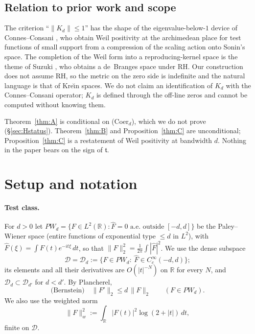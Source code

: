 \documentclass[11pt]{amsart}
\theoremstyle{definition}
\theoremstyle{remark}
\newcommand{\PW}{\mathit{PW}_d}
\newcommand{\tform}{\mathfrak t}
\newcommand{\Kop}{K}
\newcommand{\Norm}[1]{\lVert #1 \rVert}
\begin{document}
\subsection{Relation to prior work and scope}
The criterion ``$\Norm{\Kop_d}\le1$'' has the shape of the eigenvalue-below-$1$ device of
Connes--Consani \cite{ConnesConsani}, who obtain Weil positivity at the archimedean place
for test functions of small support from a compression of the scaling action onto Sonin's
space. The completion of the Weil form into a reproducing-kernel space is the theme of
Suzuki \cite{Suzuki}, who obtains a de~Branges space under RH. Our construction does not
assume RH, so the metric on the zero side is indefinite and the natural language is that of
Kre\u{\i}n spaces. We do not claim an identification of $\Kop_d$ with the Connes--Consani
operator; $\Kop_d$ is defined through the off-line zeros and cannot be computed without
knowing them.

Theorem~\ref{thm:A} is conditional on (Coer$_d$), which we do not prove
(\S\ref{sec:Hstatus}). Theorem~\ref{thm:B} and Proposition~\ref{thm:C} are unconditional;
Proposition~\ref{thm:C} is a restatement of Weil positivity at bandwidth $d$. Nothing in
the paper bears on the sign of $\tform$.

\section{Setup and notation}\label{sec:setup}

\paragraph{Test class.} For $d>0$ let
$\PW=\{F\in L^{2}(\mathbb R): \widehat F=0 \text{ a.e.\ outside } [-d,d]\}$ be the
Paley--Wiener space (entire functions of exponential type $\le d$ in $L^{2}$), with
$\widehat F(\xi)=\int F(t)e^{-it\xi}\,dt$, so that
$\Norm{F}_2^{2}=\tfrac1{2\pi}\int|\widehat F|^{2}$. We use the dense subspace
\[
\mathcal D=\mathcal D_d:=\{F\in\PW:\ \widehat F\in C_c^\infty(-d,d)\};
\]
its elements and all their derivatives are $O(|t|^{-N})$ on $\mathbb R$ for every $N$, and
$\mathcal D_d\subset\mathcal D_{d'}$ for $d<d'$. By Plancherel,
\begin{equation}\label{eq:bernstein}
\text{(Bernstein)}\quad \Norm{F'}_{2}\le d\,\Norm{F}_{2}\qquad(F\in\PW).
\end{equation}
We also use the weighted norm
\[
\Norm{F}_{w}^{2}:=\int_{\mathbb R}|F(t)|^{2}\log(2+|t|)\,dt,
\]
finite on $\mathcal D$.
\end{document}
